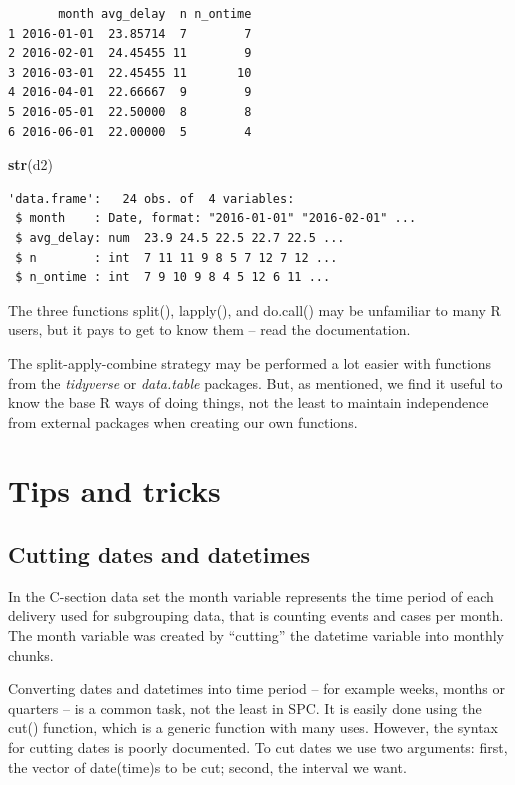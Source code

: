 \documentclass[
]{book}
\newenvironment{Shaded}{\begin{snugshade}}{\end{snugshade}}
\newcommand{\FunctionTok}[1]{\textcolor[rgb]{0.13,0.29,0.53}{\textbf{#1}}}
\newcommand{\NormalTok}[1]{#1}
\begin{document}
\begin{verbatim}
       month avg_delay  n n_ontime
1 2016-01-01  23.85714  7        7
2 2016-02-01  24.45455 11        9
3 2016-03-01  22.45455 11       10
4 2016-04-01  22.66667  9        9
5 2016-05-01  22.50000  8        8
6 2016-06-01  22.00000  5        4
\end{verbatim}

\begin{Shaded}
\begin{Highlighting}[]
\FunctionTok{str}\NormalTok{(d2)}
\end{Highlighting}
\end{Shaded}

\begin{verbatim}
'data.frame':   24 obs. of  4 variables:
 $ month    : Date, format: "2016-01-01" "2016-02-01" ...
 $ avg_delay: num  23.9 24.5 22.5 22.7 22.5 ...
 $ n        : int  7 11 11 9 8 5 7 12 7 12 ...
 $ n_ontime : int  7 9 10 9 8 4 5 12 6 11 ...
\end{verbatim}

The three functions split(), lapply(), and do.call() may be unfamiliar to many R users, but it pays to get to know them -- read the documentation.

The split-apply-combine strategy may be performed a lot easier with functions from the \emph{tidyverse} or \emph{data.table} packages. But, as mentioned, we find it useful to know the base R ways of doing things, not the least to maintain independence from external packages when creating our own functions.

\section{Tips and tricks}\label{tips-and-tricks}

\subsection{Cutting dates and datetimes}\label{cutting-dates-and-datetimes}

In the C-section data set the month variable represents the time period of each delivery used for subgrouping data, that is counting events and cases per month. The month variable was created by ``cutting'' the datetime variable into monthly chunks.

Converting dates and datetimes into time period -- for example weeks, months or quarters -- is a common task, not the least in SPC. It is easily done using the cut() function, which is a generic function with many uses. However, the syntax for cutting dates is poorly documented. To cut dates we use two arguments: first, the vector of date(time)s to be cut; second, the interval we want.
\end{document}
